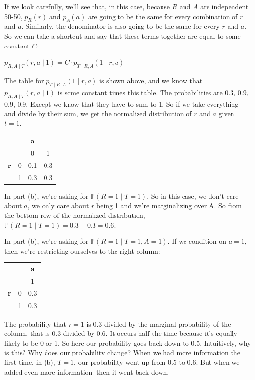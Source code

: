 \documentclass[6008notes.tex]{subfiles}
\begin{document}
If we look carefully, we'll see that, in this case, because $R$ and $A$ are independent 50-50, $p_R(r)$ and $p_A(a)$ are going to be the same for every combination of $r$ and $a$. Similarly, the denominator is also going to be the same for every $r$ and $a$. So we can take a shortcut and say that these terms together are equal to some constant $C$:

{\centering$p_{R,A \mid T}(r,a \mid 1) = C \cdot p_{T \mid R,A}(1 \mid r,a)$ \par}

The table for $p_{T \mid R,A}(1 \mid r,a)$ is shown above, and we know that $p_{R,A \mid T}(r,a \mid 1)$ is some constant times this table. The probabilities are 0.3, 0.9, 0.9, 0.9. Except we know that they have to sum to 1. So if we take everything and divide by their sum, we get the normalized distribution of $r$ and $a$ given $t=1$. 

\begin{center}
\begin{tabular}{c c | c  c}
 & & \textbf{a} & \\
 & & 0 & 1 \\
\hline
\textbf{r} & 0 &	0.1 &	0.3 \\
 & 1 &	0.3 &	0.3 \\
\end{tabular}
\end{center}

In part (b), we're asking for $\mathbb{P}(R = 1 \mid T = 1)$. So in this case, we don't care about $a$, we only care about $r$ being 1 and we're marginalizing over A. So from the bottom row of the normalized distribution,  $\mathbb{P}(R = 1 \mid T = 1) = 0.3 + 0.3 = 0.6$.

In part (b), we're asking for $\mathbb{P}(R = 1 \mid T = 1, A = 1)$. If we condition on $a=1$, then we're restricting ourselves to the right column:

\begin{center}
\begin{tabular}{c c | c}
 & & \textbf{a} \\
 & & 1 \\
\hline
\textbf{r} & 0 &	0.3 \\
           & 1 &	0.3 \\
\end{tabular}
\end{center}

The probability that $r = 1$ is 0.3 divided by the marginal probability of the column, that is 0.3 divided by 0.6. It occurs half the time because it's equally likely to be 0 or 1. So here our probability goes back down to 0.5. Intuitively, why is this? Why does our probability change? When we had more information the first time, in (b), $T = 1$, our probability went up from 0.5 to 0.6. But when we added even more information, then it went back down. 
\end{document}
